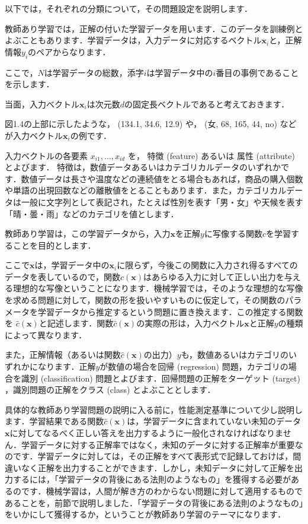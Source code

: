 以下では，それぞれの分類について，その問題設定を説明します．


教師あり学習では，正解の付いた学習データを用います．このデータを訓練例とよぶこともあります．学習データは，入力データに対応するベクトル$\bm{x}_i$と，正解情報$y_i$のペアからなります．

ここで，$N$は学習データの総数，添字$i$は学習データ中の$i$番目の事例であることを示します．

当面，入力ベクトル$\bm{x}_i$は次元数$d$の固定長ベクトルであると考えておきます．

図1.4の上部に示したような， (134.1, 34.6, 12.9) や， (女, 68, 165, 44, no) などが入力ベクトル$\bm{x}_i$の例です．

入力ベクトルの各要素 $x_{i1},\dots,x_{id}$ を，
特徴 (feature)
 あるいは
 属性 (attribute) 
 とよびます．
特徴は，数値データあるいはカテゴリカルデータのいずれかです．数値データは長さや温度などの連続値をとる場合もあれば，商品の購入個数や単語の出現回数などの離散値をとることもあります．また，カテゴリカルデータは一般に文字列として表記され，たとえば性別を表す「男・女」や天候を表す「晴・曇・雨」などのカテゴリを値とします．

教師あり学習は，この学習データから，入力$\bm{x}$を正解$y$に写像する関数$c$を学習することを目的とします．

ここで$\bm{x}$は，学習データ中の$\bm{x}_i$に限らず，今後この関数に入力され得るすべてのデータを表しているので，関数$c(\bm{x})$はあらゆる入力に対して正しい出力を与える理想的な写像ということになります．機械学習では，そのような理想的な写像を求める問題に対して，関数の形を扱いやすいものに仮定して，その関数のパラメータを学習データから推定するという問題に置き換えます．この推定する関数を
$\hat{c}(\bm{x})$と記述します．関数$\hat{c}(\bm{x})$の実際の形は，入力ベクトル$\bm{x}$と正解$y$の種類によって異なります．

また，正解情報（あるいは関数$\hat{c}(\bm{x})$の出力）$y$も，数値あるいはカテゴリのいずれかになります．正解$y$が数値の場合を回帰 (regression) 問題，カテゴリの場合を識別 (classification) 問題とよびます．回帰問題の正解をターゲット (target) ，識別問題の正解をクラス (class) とよぶこととします．

具体的な教師あり学習問題の説明に入る前に，性能測定基準について少し説明します．学習結果である関数$\hat{c}(\bm{x})$は，学習データに含まれていない未知のデータ$\bm{x}$に対してなるべく正しい答えを出力するように一般化されなければなりません．学習データに対する正解率ではなく，未知のデータに対する正解率が重要なのです．学習データに対しては，その正解をすべて表形式で記録しておけば，間違いなく正解を出力することができます．しかし，未知データに対して正解を出力するには，「学習データの背後にある法則のようなもの」を獲得する必要があるのです．機械学習は，人間が解き方のわからない問題に対して適用するものであることを，前節で説明しました．「学習データの背後にある法則のようなもの」をいかにして獲得するか，ということが教師あり学習のテーマになります．

